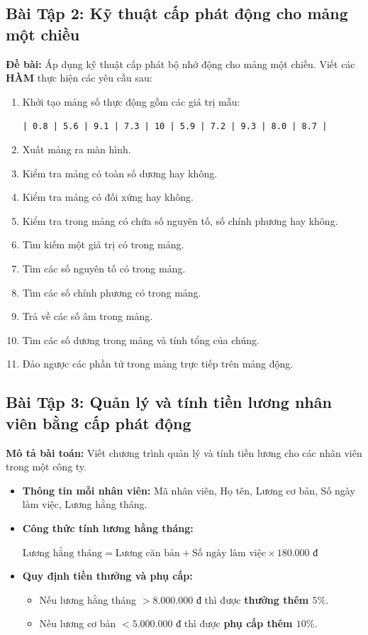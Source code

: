 \documentclass[12pt,a4paper]{article}
\begin{document}
\subsection{Bài Tập 2: Kỹ thuật cấp phát động cho mảng một chiều}
\textbf{Đề bài:} Áp dụng kỹ thuật cấp phát bộ nhớ động cho mảng một chiều. Viết các \textbf{HÀM} thực hiện các yêu cầu sau:
\begin{enumerate}[itemsep=0.15em]
    \item Khởi tạo mảng số thực động gồm các giá trị mẫu:
    \begin{center}
        \texttt{| 0.8 | 5.6 | 9.1 | 7.3 | 10 | 5.9 | 7.2 | 9.3 | 8.0 | 8.7 |}
    \end{center}
    \item Xuất mảng ra màn hình.
    \item Kiểm tra mảng có toàn số dương hay không.
    \item Kiểm tra mảng có đối xứng hay không.
    \item Kiểm tra trong mảng có chứa số nguyên tố, số chính phương hay không.
    \item Tìm kiếm một giá trị có trong mảng.
    \item Tìm các số nguyên tố có trong mảng.
    \item Tìm các số chính phương có trong mảng.
    \item Trả về các số âm trong mảng.
    \item Tìm các số dương trong mảng và tính tổng của chúng.
    \item Đảo ngược các phần tử trong mảng trực tiếp trên mảng động.
\end{enumerate}

\subsection{Bài Tập 3: Quản lý và tính tiền lương nhân viên bằng cấp phát động}
\textbf{Mô tả bài toán:} Viết chương trình quản lý và tính tiền lương cho các nhân viên trong một công ty.
\begin{itemize}[itemsep=0.15em]
    \item \textbf{Thông tin mỗi nhân viên:} Mã nhân viên, Họ tên, Lương cơ bản, Số ngày làm việc, Lương hằng tháng.
    \item \textbf{Công thức tính lương hằng tháng:}
    \begin{center}
        $\text{Lương hằng tháng} = \text{Lương căn bản} + \text{Số ngày làm việc} \times 180.000\text{ đ}$
    \end{center}
    \item \textbf{Quy định tiền thưởng và phụ cấp:}
    \begin{itemize}
        \item Nếu lương hằng tháng $> 8.000.000\text{ đ}$ thì được \textbf{thưởng thêm $5\%$}.
        \item Nếu lương cơ bản $< 5.000.000\text{ đ}$ thì được \textbf{phụ cấp thêm $10\%$}.
    \end{itemize}
\end{itemize}
\end{document}
